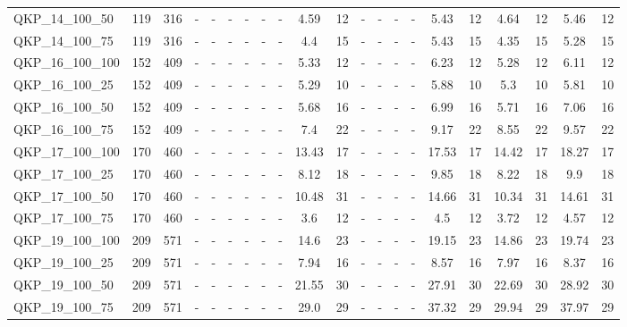 \begin{sidewaystable}[!ht]
{\begin{tabular}{lcccccccccccccccccccc}
QKP\_14\_100\_50 & 119 & 316 &  - &  - &  - &  - &  - &  - &  \textcolor{blue2}{4.59} & 12 &  - &  - &  - &  - & 5.43 & 12 & 4.64 & 12 & 5.46 & 12 \\
QKP\_14\_100\_75 & 119 & 316 &  - &  - &  - &  - &  - &  - & 4.4 & 15 &  - &  - &  - &  - & 5.43 & 15 &  \textcolor{blue2}{4.35} & 15 & 5.28 & 15 \\
QKP\_16\_100\_100 & 152 & 409 &  - &  - &  - &  - &  - &  - & 5.33 & 12 &  - &  - &  - &  - & 6.23 & 12 &  \textcolor{blue2}{5.28} & 12 & 6.11 & 12 \\
QKP\_16\_100\_25 & 152 & 409 &  - &  - &  - &  - &  - &  - &  \textcolor{blue2}{5.29} & 10 &  - &  - &  - &  - & 5.88 & 10 & 5.3 & 10 & 5.81 & 10 \\
QKP\_16\_100\_50 & 152 & 409 &  - &  - &  - &  - &  - &  - &  \textcolor{blue2}{5.68} & 16 &  - &  - &  - &  - & 6.99 & 16 & 5.71 & 16 & 7.06 & 16 \\
QKP\_16\_100\_75 & 152 & 409 &  - &  - &  - &  - &  - &  - &  \textcolor{blue2}{7.4} & 22 &  - &  - &  - &  - & 9.17 & 22 & 8.55 & 22 & 9.57 & 22 \\
QKP\_17\_100\_100 & 170 & 460 &  - &  - &  - &  - &  - &  - &  \textcolor{blue2}{13.43} & 17 &  - &  - &  - &  - & 17.53 & 17 & 14.42 & 17 & 18.27 & 17 \\
QKP\_17\_100\_25 & 170 & 460 &  - &  - &  - &  - &  - &  - &  \textcolor{blue2}{8.12} & 18 &  - &  - &  - &  - & 9.85 & 18 & 8.22 & 18 & 9.9 & 18 \\
QKP\_17\_100\_50 & 170 & 460 &  - &  - &  - &  - &  - &  - & 10.48 & 31 &  - &  - &  - &  - & 14.66 & 31 &  \textcolor{blue2}{10.34} & 31 & 14.61 & 31 \\
QKP\_17\_100\_75 & 170 & 460 &  - &  - &  - &  - &  - &  - &  \textcolor{blue2}{3.6} & 12 &  - &  - &  - &  - & 4.5 & 12 & 3.72 & 12 & 4.57 & 12 \\
QKP\_19\_100\_100 & 209 & 571 &  - &  - &  - &  - &  - &  - &  \textcolor{blue2}{14.6} & 23 &  - &  - &  - &  - & 19.15 & 23 & 14.86 & 23 & 19.74 & 23 \\
QKP\_19\_100\_25 & 209 & 571 &  - &  - &  - &  - &  - &  - &  \textcolor{blue2}{7.94} & 16 &  - &  - &  - &  - & 8.57 & 16 & 7.97 & 16 & 8.37 & 16 \\
QKP\_19\_100\_50 & 209 & 571 &  - &  - &  - &  - &  - &  - &  \textcolor{blue2}{21.55} & 30 &  - &  - &  - &  - & 27.91 & 30 & 22.69 & 30 & 28.92 & 30 \\
QKP\_19\_100\_75 & 209 & 571 &  - &  - &  - &  - &  - &  - &  \textcolor{blue2}{29.0} & 29 &  - &  - &  - &  - & 37.32 & 29 & 29.94 & 29 & 37.97 & 29 \\

\end{tabular}}
\end{sidewaystable}
